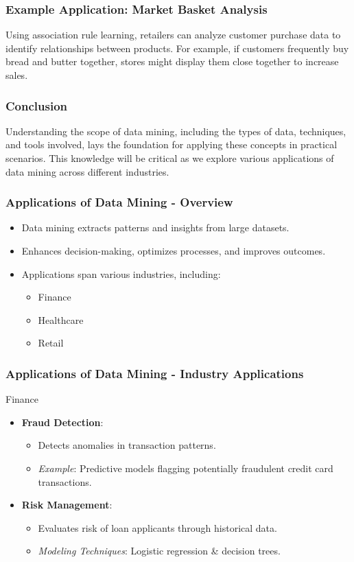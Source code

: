 \documentclass[aspectratio=169]{beamer}
\begin{document}
\begin{frame}[fragile]
    \frametitle{Example Application: Market Basket Analysis}
    Using association rule learning, retailers can analyze customer purchase data to identify relationships between products. For example, if customers frequently buy bread and butter together, stores might display them close together to increase sales.
\end{frame}

\begin{frame}[fragile]
    \frametitle{Conclusion}
    Understanding the scope of data mining, including the types of data, techniques, and tools involved, lays the foundation for applying these concepts in practical scenarios. This knowledge will be critical as we explore various applications of data mining across different industries.
\end{frame}

\begin{frame}[fragile]
    \frametitle{Applications of Data Mining - Overview}
    \begin{itemize}
        \item Data mining extracts patterns and insights from large datasets.
        \item Enhances decision-making, optimizes processes, and improves outcomes.
        \item Applications span various industries, including:
        \begin{itemize}
            \item Finance
            \item Healthcare
            \item Retail
        \end{itemize}
    \end{itemize}
\end{frame}

\begin{frame}[fragile]
    \frametitle{Applications of Data Mining - Industry Applications}
    \begin{block}{Finance}
        \begin{itemize}
            \item \textbf{Fraud Detection}: 
                \begin{itemize}
                    \item Detects anomalies in transaction patterns.
                    \item \textit{Example}: Predictive models flagging potentially fraudulent credit card transactions.
                \end{itemize}
            \item \textbf{Risk Management}:
                \begin{itemize}
                    \item Evaluates risk of loan applicants through historical data.
                    \item \textit{Modeling Techniques}: Logistic regression & decision trees.
                \end{itemize}
        \end{itemize}
    \end{block}
\end{frame}
\end{document}
